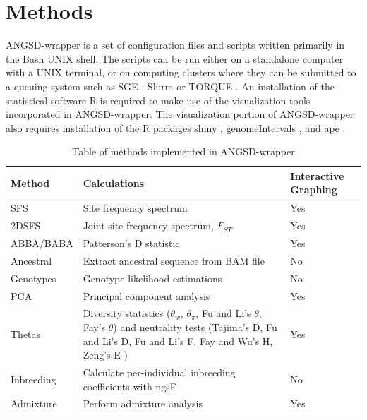\documentclass[10pt,a4paper]{article}
\newcommand{\fst}{${F_{ST}}$ }
\begin{document}
\section*{Methods}
ANGSD-wrapper is a set of configuration files and scripts written primarily in the Bash UNIX shell.  
The scripts can be run either on a standalone computer with a UNIX terminal, or on computing clusters where they can be submitted to a queuing system such as SGE \citep{Microsystems):2001:SGE:560889.792378}, Slurm \citep{Jette02slurm:simple} or TORQUE \citep{Staples:2006:TRM:1188455.1188464}.  
An installation of the statistical software R \citep{Rcitation} is required to make use of the visualization tools incorporated in ANGSD-wrapper.  
The visualization portion of ANGSD-wrapper also requires installation of the R packages shiny \citep{shiny}, genomeIntervals \citep{genomeIntervals}, and ape \citep{APE}.


\begin{table}
\begin{center}
    \begin{tabular}{ | p{3.5cm} | p{5cm} | p{2.5cm}  |}
    \hline
    \textbf{Method} & \textbf{Calculations} & \textbf{Interactive Graphing} \\ \hline \hline
    SFS     &    Site frequency spectrum  & Yes  \\ \hline     2DSFS   &    Joint site frequency spectrum, \fst & Yes  \\ \hline 
    ABBA/BABA  &  Patterson's D statistic & Yes  \\ \hline 
    Ancestral &  Extract ancestral sequence from BAM file  & No \\ \hline 
    Genotypes &  Genotype likelihood estimations & No  \\ \hline 
    PCA     &    Principal component analysis & Yes  \\ \hline 
    Thetas   &   Diversity statistics ($\theta_w$, $\theta_\pi$, Fu and Li's $\theta$, Fay's $\theta$) and neutrality tests (Tajima's D, Fu and Li's D, Fu and Li's F,  Fay and Wu's H, Zeng's E ) & Yes  \\ \hline 
    Inbreeding & Calculate per-individual inbreeding coefficients with ngsF & No  \\ \hline 
    Admixture  & Perform admixture analysis & Yes  \\ \hline 
    \end{tabular}
    \caption{Table of methods implemented in ANGSD-wrapper}
    \label{tab:methods}
    \end{center}
\end{table}
\end{document}
